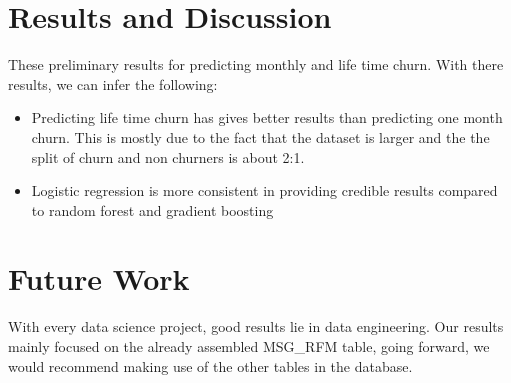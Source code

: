 \documentclass[
10pt, %
a4paper, %
oneside, %
headinclude,footinclude, %
BCOR5mm, %
]{scrartcl}
\begin{document}
\section{Results and Discussion}

These preliminary results for predicting monthly and life time churn. With there results, we can infer the following: 
\begin{itemize}
\item Predicting life time churn has gives better results than predicting one month churn. This is mostly due to the fact that the dataset is larger and the the split of churn and non churners is about 2:1.
\item Logistic regression is more consistent in providing credible results compared to random forest and gradient boosting

\end{itemize}

\newpage
\section{Future Work}

With every data science project, good results lie in data engineering. Our results mainly focused on the already assembled MSG\_RFM table, going forward, we would recommend making use of the other tables in the database. 





\renewcommand{\refname}{\spacedlowsmallcaps{References}} %




\end{document}
